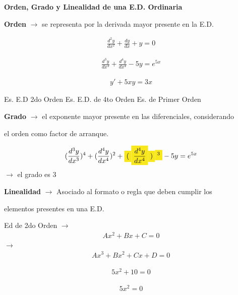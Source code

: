 \documentclass{article}
\begin{document}
\textbf{Orden, Grado y Linealidad de una E.D. Ordinaria}

\textbf{Orden} $\rightarrow$  se representa por la derivada mayor presente en la E.D.


\begin{gather*}
\frac{d^{2}y}{dx^{2}} +\frac{dy}{dx}+y=0
\end{gather*}
             
\begin{gather*}
\frac{d^{3}y}{dx^{3}} +\frac{d^{4}y}{dx^{4}}-5y=e^{5x}
\end{gather*}
        
\begin{gather*}
y'+5xy=3x
\end{gather*}


Es. E.D 2do Orden			Es. E.D. de 4to Orden	 Es. de Primer Orden



\textbf{Grado} $\rightarrow$  el exponente mayor presente en las diferenciales, considerando 

el orden como factor de arranque.


\begin{gather*}
(\frac{d^{3}y}{dx^{3}})^{4} +(\frac{d^{4}y}{dx^{4}})^{2}+\text{\colorbox[RGB]{248,231,28}{$($}}\text{\colorbox[RGB]{248,231,28}{$\frac{d^{4}y}{dx^{4}}$}}\text{\colorbox[RGB]{248,231,28}{$)$}}\text{\colorbox[RGB]{248,231,28}{$^{3}$}}-5y=e^{5x}
\end{gather*}
  $\rightarrow$  el grado es 3





\textbf{Linealidad} $\rightarrow$  Asociado al formato o regla que deben cumplir los 

elementos presentes en una E.D.

	Ed de 2do Orden $\rightarrow$    
\begin{gather*}
Ax^{2}+Bx+C = 0
\end{gather*}
  $\rightarrow$     
\begin{gather*}
Ax^{3}+Bx^{2}+Cx+D = 0^{}
\end{gather*}


	
\begin{gather*}
5x^{2}+10 = 0
\end{gather*}
       
\begin{gather*}
5x^{2}=0
\end{gather*}
     
\end{document}
